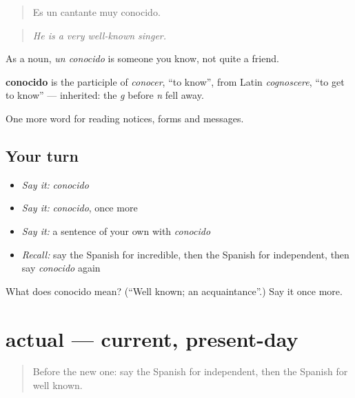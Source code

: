 \begin{quote}
Es un cantante muy conocido.
\end{quote}

\begin{quote}
\emph{He is a very well-known singer.}
\end{quote}

As a noun, \emph{un conocido} is someone you know, not quite a friend.

\begin{cousinweb}
\textbf{conocido} is the participle of \emph{conocer}, \textquotedblleft{}to know\textquotedblright{}, from Latin \emph{cognoscere}, \textquotedblleft{}to get to know\textquotedblright{} — inherited: the \emph{g} before \emph{n} fell away.
\end{cousinweb}

\begin{grammarlens}[title={What you've built}]
One more word for reading notices, forms and messages.
\end{grammarlens}

\subsection*{Your turn}
\begin{itemize}
\raggedright
  \item \emph{Say it:} \emph{conocido}
  \item \emph{Say it:} \emph{conocido}, once more
  \item \emph{Say it:} a sentence of your own with \emph{conocido}
  \item \emph{Recall:} say the Spanish for incredible, then the Spanish for independent, then say \emph{conocido} again
\end{itemize}

\begin{tcolorbox}[breakable,colback=teal!4,colframe=teal!35!black,title={Before you move on}]
What does conocido mean? (\textquotedblleft{}Well known; an acquaintance\textquotedblright{}.) Say it once more.
\end{tcolorbox}
\section[actual]{actual — current, present-day}

\label{lesson:ES-C508-actual}



\begin{quote}
Before the new one: say the Spanish for independent, then the Spanish for well known.
\end{quote}

